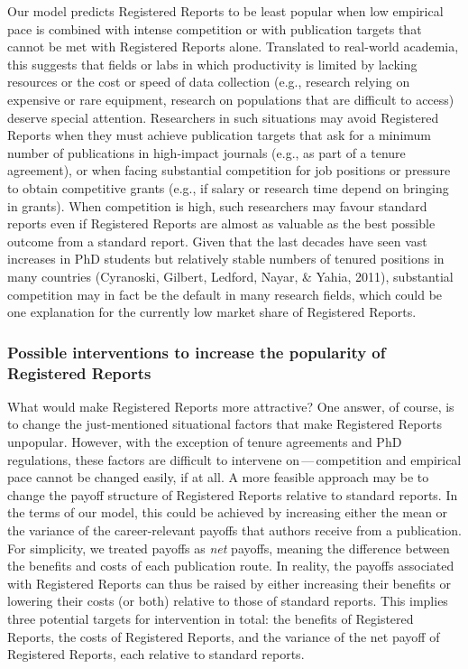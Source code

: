 \documentclass[
  ,man,mask,floatsintext]{apa6}
\begin{document}
Our model predicts Registered Reports to be least popular when low empirical pace is combined with intense competition or with publication targets that cannot be met with Registered Reports alone.
Translated to real-world academia, this suggests that fields or labs in which productivity is limited by lacking resources or the cost or speed of data collection (e.g., research relying on expensive or rare equipment, research on populations that are difficult to access) deserve special attention.
Researchers in such situations may avoid Registered Reports when they must achieve publication targets that ask for a minimum number of publications in high-impact journals (e.g., as part of a tenure agreement), or when facing substantial competition for job positions or pressure to obtain competitive grants (e.g., if salary or research time depend on bringing in grants).
When competition is high, such researchers may favour standard reports even if Registered Reports are almost as valuable as the best possible outcome from a standard report.
Given that the last decades have seen vast increases in PhD students but relatively stable numbers of tenured positions in many countries (Cyranoski, Gilbert, Ledford, Nayar, \& Yahia, 2011), substantial competition may in fact be the default in many research fields, which could be one explanation for the currently low market share of Registered Reports.

\par\vspace{.8\baselineskip}

\hypertarget{possible-interventions-to-increase-the-popularity-of-registered-reports}{%
\subsubsection{Possible interventions to increase the popularity of Registered Reports}\label{possible-interventions-to-increase-the-popularity-of-registered-reports}}

What would make Registered Reports more attractive?
One answer, of course, is to change the just-mentioned situational factors that make Registered Reports unpopular.
However,
with the exception of tenure agreements and PhD regulations, these
factors are difficult to intervene on\(\,\)---\(\,\)competition and empirical pace cannot be changed easily, if at all.
A more feasible approach may be to change the payoff structure of Registered Reports relative to standard reports.
In the terms of our model, this could be achieved by increasing either the mean or the variance of the career-relevant payoffs that authors receive from a publication.
For simplicity, we treated payoffs as \emph{net} payoffs, meaning the difference between the benefits and costs of each publication route.
In reality,
the payoffs associated with Registered Reports can thus be raised by either increasing their benefits or lowering their costs (or both) relative to those of standard reports.
This implies three potential targets for intervention in total:
the benefits of Registered Reports, the costs of Registered Reports, and the variance of the net payoff of Registered Reports, each relative to standard reports.
\end{document}
